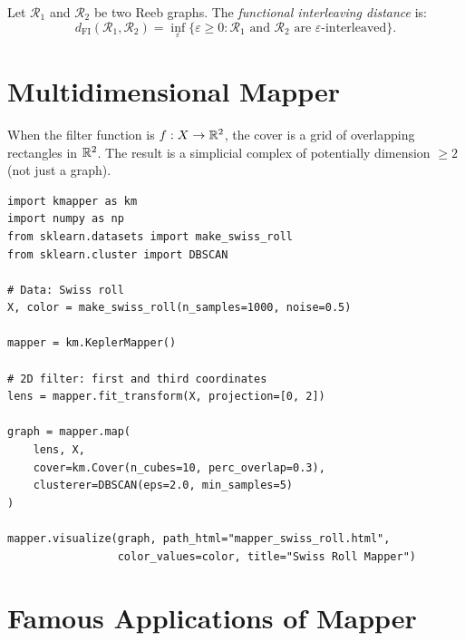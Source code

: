 \begin{definition}
Let $\mathcal{R}_1$ and $\mathcal{R}_2$ be two Reeb graphs. The
\emph{functional interleaving distance} is:
\[
  d_{\mathrm{FI}}(\mathcal{R}_1, \mathcal{R}_2) =
  \inf_{\varepsilon} \{\varepsilon \geq 0 :
  \mathcal{R}_1 \text{ and } \mathcal{R}_2 \text{ are }
  \varepsilon\text{-interleaved}\}.
\]
\end{definition}

\section{Multidimensional Mapper}

\begin{definition}[2D Mapper]
When the filter function is $f : X \to \mathbb{R}^2$, the cover is a grid of
overlapping rectangles in $\mathbb{R}^2$. The result is a simplicial complex of
potentially dimension $\geq 2$ (not just a graph).
\end{definition}

\begin{codeblock}[title=\textbf{2D Mapper with KeplerMapper}]
\begin{verbatim}
import kmapper as km
import numpy as np
from sklearn.datasets import make_swiss_roll
from sklearn.cluster import DBSCAN

# Data: Swiss roll
X, color = make_swiss_roll(n_samples=1000, noise=0.5)

mapper = km.KeplerMapper()

# 2D filter: first and third coordinates
lens = mapper.fit_transform(X, projection=[0, 2])

graph = mapper.map(
    lens, X,
    cover=km.Cover(n_cubes=10, perc_overlap=0.3),
    clusterer=DBSCAN(eps=2.0, min_samples=5)
)

mapper.visualize(graph, path_html="mapper_swiss_roll.html",
                 color_values=color, title="Swiss Roll Mapper")
\end{verbatim}
\end{codeblock}

\section{Famous Applications of Mapper}

